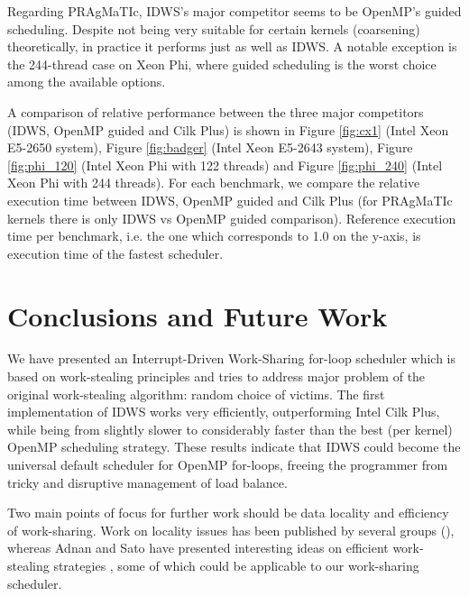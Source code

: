 \documentclass{acm_proc_article-sp}
\newcommand{\PRAGMATIC}{PRAgMaTIc\xspace}
\begin{document}
Regarding \PRAGMATIC, IDWS's major competitor seems to be OpenMP's guided
scheduling. Despite not being very suitable for certain kernels (coarsening)
theoretically, in practice it performs just as well as IDWS. A notable exception
is the 244-thread case on Xeon Phi, where guided scheduling is the worst choice
among the available options.

A comparison of relative performance between the three major competitors (IDWS,
OpenMP guided and Cilk Plus) is shown in Figure \ref{fig:cx1} (Intel Xeon
E5-2650 system), Figure \ref{fig:badger} (Intel Xeon E5-2643 system), Figure
\ref{fig:phi_120} (Intel Xeon Phi with 122 threads) and Figure
\ref{fig:phi_240} (Intel Xeon Phi with 244 threads). For each benchmark, we
compare the relative execution time between IDWS, OpenMP guided and Cilk Plus
(for \PRAGMATIC kernels there is only IDWS vs OpenMP guided comparison).
Reference execution time per benchmark, i.e. the one which corresponds to 1.0 on
the y-axis, is execution time of the fastest scheduler.


\section{Conclusions and Future Work}
\label{sect:conclusions}
We have presented an Interrupt-Driven Work-Sharing for-loop scheduler which is
based on work-stealing principles and tries to address major problem of the
original work-stealing algorithm: random choice of victims. The first
implementation of IDWS works very efficiently, outperforming Intel Cilk Plus,
while being from slightly slower to considerably faster than the best (per
kernel) OpenMP scheduling strategy. These results indicate that IDWS could
become the universal default scheduler for OpenMP for-loops, freeing the
programmer from tricky and disruptive management of load balance.

Two main points of focus for further work should be data locality and
efficiency of work-sharing. Work on locality issues has been published by
several groups (\cite{Olivier:2012:OTS:2237840.2237846, 5470425, 4536188,
Acar:locality}), whereas Adnan and Sato have presented interesting ideas on
efficient work-stealing strategies \cite{6008879}, some of which could be
applicable to our work-sharing scheduler.



\end{document}
